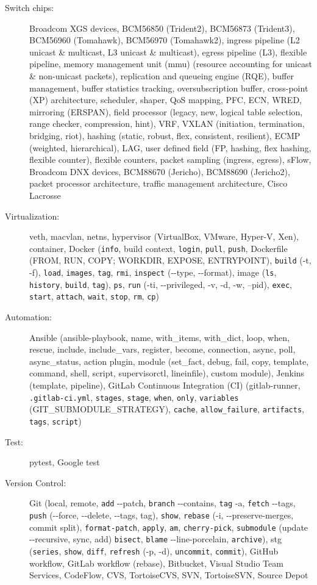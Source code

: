 \documentclass[letterpaper,11pt]{article}
\begin{document}
\begin{description}
\item[Switch chips:] Broadcom XGS devices, BCM56850 (Trident2), BCM56873 (Trident3), BCM56960 (Tomahawk), BCM56970 (Tomahawk2),
ingress pipeline (L2 unicast \& multicast, L3 unicast \& multicast), egress pipeline (L3),
flexible pipeline, memory management unit (mmu) (resource accounting for unicast \& non-unicast packets), replication and queueing engine (RQE),
buffer management, buffer statistics tracking, oversubscription buffer,
cross-point (XP) architecture, scheduler, shaper, QoS mapping, PFC, ECN, WRED, mirroring (ERSPAN),
field processor (legacy, new, logical table selection, range checker, compression, hint),
VRF, VXLAN (initiation, termination, bridging, riot), hashing (static, robust, flex, consistent, resilient), ECMP (weighted, hierarchical), LAG,
user defined field (FP, hashing, flex hashing, flexible counter), flexible counters,
packet sampling (ingress, egress), sFlow,
Broadcom DNX devices, BCM88670 (Jericho), BCM88690 (Jericho2), packet processor architecture, traffic management architecture,
Cisco Lacrosse

\item[Virtualization:] veth, macvlan, netns, hypervisor (VirtualBox, VMware, Hyper-V, Xen), container, Docker ({\tt info},
build context, {\tt login}, {\tt pull}, {\tt push},
Dockerfile (FROM, RUN, COPY; WORKDIR, EXPOSE, ENTRYPOINT), {\tt build} (-t, -f),
{\tt load}, {\tt images}, {\tt tag}, {\tt rmi}, {\tt inspect} (-{}-type, -{}-format),
image ({\tt ls}, {\tt history}, {\tt build}, {\tt tag}),
{\tt ps}, {\tt run} (-ti, -{}-privileged, -v, -d, -w, --pid), {\tt exec}, {\tt start}, {\tt attach}, {\tt wait}, {\tt stop}, {\tt rm},
{\tt cp})

\item[Automation:] Ansible (ansible-playbook, name, with\_items, with\_dict, loop, when, rescue, include, include\_vars, register, become, connection,
async, poll, async\_status, action plugin,
module (set\_fact, debug, fail, copy, template, command, shell, script, supervisorctl, lineinfile), custom module),
Jenkins (template, pipeline), GitLab Continuous Integration (CI) (gitlab-runner, {\tt .gitlab-ci.yml}, {\tt stages}, {\tt stage},
{\tt when}, {\tt only}, {\tt variables} (GIT\_SUBMODULE\_STRATEGY), {\tt cache}, {\tt allow\_failure}, {\tt artifacts}, {\tt tags}, {\tt script})

\item[Test:] pytest, Google test

\item[Version Control:] Git (local, remote, {\tt add} -{}-patch, {\tt branch} -{}-contains, {\tt tag} -a,
{\tt fetch} -{}-tags, {\tt push} (-{}-force, -{}-delete, -{}-tags, tag), {\tt show}, {\tt rebase} (-i, -{}-preserve-merges, commit split),
{\tt format-patch}, {\tt apply}, {\tt am}, {\tt cherry-pick}, {\tt submodule} (update -{}-recursive, sync, add)
{\tt bisect}, {\tt blame} -{}-line-porcelain, {\tt archive}),
%
stg ({\tt series}, {\tt show}, {\tt diff}, {\tt refresh} (-p, -d), {\tt uncommit}, {\tt commit}),
%
GitHub workflow, GitLab workflow (rebase), Bitbucket, Visual Studio Team Services,
CodeFlow, CVS, TortoiseCVS, SVN, TortoiseSVN, Source Depot


\end{description}
\end{document}
